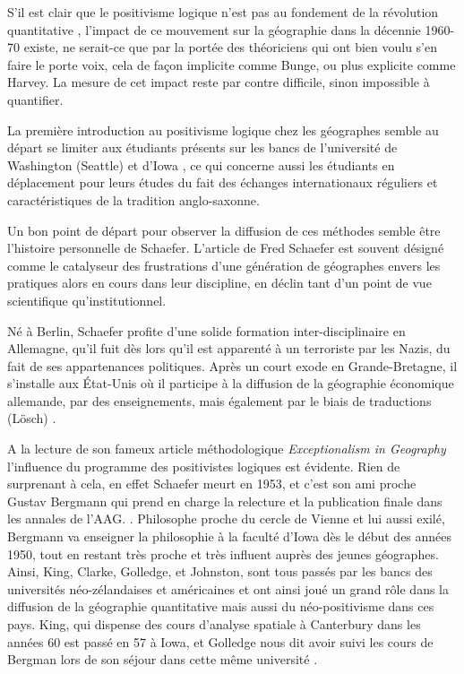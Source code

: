 S'il est clair que le positivisme logique n'est pas au fondement de la révolution quantitative \autocite{Claval2003}, l'impact de ce mouvement sur la géographie dans la décennie 1960-70 existe, ne serait-ce que par la portée des théoriciens qui ont bien voulu s'en faire le porte voix, cela de façon implicite comme Bunge, ou plus  explicite comme Harvey. La mesure de cet impact reste par contre difficile, sinon impossible à quantifier.

La première introduction au positivisme logique chez les géographes semble au départ se limiter aux étudiants présents sur les bancs de l'université de Washington (Seattle) et d'Iowa \autocite[554]{Barnes2001a} \autocite[120-121]{Unwin1992}, ce qui concerne aussi les étudiants en déplacement pour leurs études du fait des échanges internationaux réguliers et caractéristiques de la tradition anglo-saxonne.

Un bon point de départ pour observer la diffusion de ces méthodes semble être l'histoire personnelle de Schaefer. L'article de Fred Schaefer \autocite{Schaefer1953} est souvent désigné \autocite[15]{Louail2010} comme le catalyseur des frustrations d'une génération de géographes envers les pratiques alors en cours dans leur discipline, en déclin tant d'un point de vue scientifique qu’institutionnel.

Né à Berlin, Schaefer profite d'une solide formation inter-disciplinaire en Allemagne, qu'il fuit dès lors qu'il est apparenté à un terroriste par les Nazis, du fait de ses appartenances politiques. Après un court exode en Grande-Bretagne, il s'installe aux État-Unis où il participe à la diffusion de la géographie économique allemande, par des enseignements, mais également par le biais de traductions (Lösch) \autocite{Bunge1979}. 

A la lecture de son fameux article méthodologique \textit{Exceptionalism in Geography} l'influence du programme des positivistes logiques est évidente. Rien de surprenant à cela, en effet Schaefer meurt en 1953, et c'est son ami proche Gustav Bergmann qui prend en charge la relecture et la publication finale dans les annales de l'AAG. \autocite[32]{Gregory1978}. Philosophe proche du cercle de Vienne et lui aussi exilé, Bergmann va enseigner la philosophie à la faculté d'Iowa dès le début des années 1950, tout en restant très proche et très influent auprès des jeunes géographes.\autocite[192]{Buttimer1983} Ainsi, King, Clarke, Golledge, et Johnston, sont tous passés par les bancs des universités néo-zélandaises et américaines et ont ainsi joué un grand rôle dans la diffusion de la géographie quantitative mais aussi du néo-positivisme dans ces pays. King, qui dispense des cours d'analyse spatiale à Canterbury dans les années 60 est passé en 57 à Iowa, et Golledge nous dit avoir suivi les cours de Bergman lors de son séjour dans cette même université \autocite[95-96]{Bailly2000} . 

